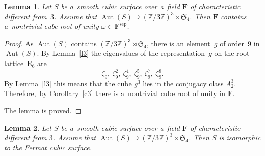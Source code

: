\documentclass{amsart}
\numberwithin{equation}{section}
\theoremstyle{plain}
\newtheorem{lemma}{Lemma}
\theoremstyle{definition}
\theoremstyle{remark}
\begin{document}
\begin{lemma}
\label{l43}
Let $S$ be a~smooth cubic surface over a~field $\mathbf{F}$ of characteristic different from~$3$. Assume that $\operatorname{Aut}(S) \supseteq (\mathbb{Z}/3\mathbb{Z})^3 \rtimes \mathfrak{S}_4$. Then $\mathbf{F}$ contains a~nontrivial cube root of unity $\omega \in \mathbf{F}^{\mathrm{sep}}$.
\end{lemma}

\begin{proof}
As $\operatorname{Aut}(S)$ contains $ (\mathbb{Z}/3\mathbb{Z})^3 \rtimes \mathfrak{S}_4$, there is an element~$g$ of order~$9$ in $\operatorname{Aut}(S)$. By Lemma~\ref{l3} the eigenvalues of the representation~$g$ on the root lattice~$\mathrm{E}_6$ are
$$
\zeta_9,\ \zeta_9^2,\ \zeta_9^4,\ \zeta_9^5,\ \zeta_9^7,\ \zeta_9^8.
$$
By Lemma~\ref{l3} this means that the cube $g^3$ lies in the conjugacy class $A_2^3$. Therefore,~by Corollary~\ref{c3} there is a~nontrivial cube root of unity in $\mathbf{F}$.

The lemma is proved.
\end{proof}

\begin{lemma}
\label{l44}
Let $S$ be a~smooth cubic surface over a~field $\mathbf{F}$ of characteristic different from $3$. Assume that $\operatorname{Aut}(S) \supseteq (\mathbb{Z}/3\mathbb{Z})^3 \rtimes \mathfrak{S}_4$. Then $S$ is isomorphic to the Fermat cubic surface.
\end{lemma}
\end{document}

